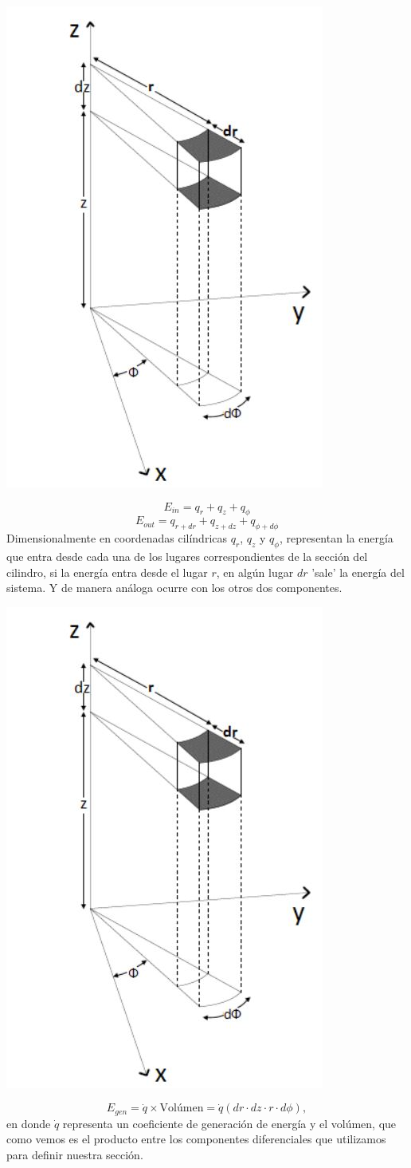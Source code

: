 \documentclass{beamer}
\begin{document}
\begin{frame}{}

\begin{block}{}
\begin{center}
    \includegraphics[width=0.2\linewidth]{EDPheat.JPG}
\end{center}
$$E_{in} = q_r + q_z + q_{\phi}$$
$$E_{out} = q_{r + dr} + q_{z + dz} + q_{\phi + d \phi}$$
Dimensionalmente en coordenadas cilíndricas $q_r$, $q_{z}$ y $q_{\phi}$, representan la energía que entra desde cada una de los lugares correspondientes de la sección del cilindro, si la energía entra desde el lugar $r$, en algún lugar $dr$ 'sale' la energía del sistema. Y de manera análoga ocurre con los otros dos componentes.
\end{block}

\end{frame}

\begin{frame}{}

\begin{block}{}
	\begin{center}
		\includegraphics[width=0.2\linewidth]{EDPheat.JPG}
	\end{center}
	$$E_{gen} = \dot{q} \times \text{Volúmen} = \dot{q}(dr \cdot dz \cdot r  \cdot d\phi),$$
	en donde $\dot{q}$ representa un coeficiente de generación de energía y el volúmen, que como vemos es el producto entre los componentes diferenciales que utilizamos para definir nuestra sección.
\end{block}

\end{frame}
\end{document}
